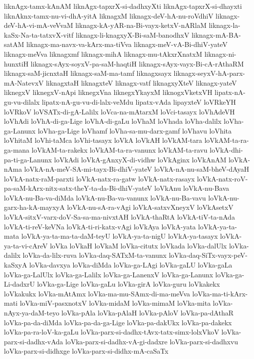 {liknAgx-tamx-kAnAM
liknAgx-tapxrX-si-dadhxyXti
liknAgx-tapxrX-si-dhayxti
liknAknx-tamx-nu-vi-dhA-yitA
liknagxM
liknagx-deV-hA-nu-roVdhiV
liknagx-deV-hA-vi-mA-veVvaM
liknagx-kA-yAR-na-Bi-vayx-ketxV-nARlaM
liknagx-la-kaSx-Na-ta-tatxvX-vitf
liknagx-li-knagxyX-Bi-saM-banodhxV
liknagx-mA-BA-satAM
liknagx-ma-navx-va-kArx-ma-tiVva
liknagx-meV-vA-Bi-dhiV-yateV
liknagx-meVva
liknagxmf
liknagx-mihA
liknagx-mu-tAkxrXnatxM
liknagx-ni-hunxtiH
liknagx-sAyx-soyxV-pa-saM-haqtiH
liknagx-sAyx-vayx-Bi-cA-rAthaRM
liknagx-saM-jicnxtaH
liknagx-saM-ma-tamf
liknagxsayx
liknagx-seyxV-hA-parx-mA-NatevxV
liknagxtaH
liknagxteV
liknagx-vatf
liknagxyXteV
liknagx-yateV
liknegxV
liknegxV-nApi
liknegxVna
liknegxYkayxM
liknogxVketxVH
lipatx-nA-gu-vu-dilalx
lipatx-nA-gu-vu-di-lalx-veMdu
lipatx-vAda
lipayxteV
loVRkeYH
loVRkoV
loVSATx-di-gA-Lalilx
loVca-na-mAtarxM
loVci-tasayx
loVhAdeVH
loVhAdi
loVhA-di-ga-Lige
loVhA-di-gaLu
loVhaM
loVhada
loVha-dalilx
loVha-ga-Lanunx
loVha-ga-Lige
loVhamf
loVha-sa-mu-darx-gamf
loVhavu
loVhita
loVhitaM
loVhi-taMca
loVhi-tasayx
loVkA
loVkAH
loVkAM-tara
loVkAM-ta-ra-ga-mana
loVkAM-ta-rakekx
loVkAM-ta-ra-vanunx
loVkAM-ta-ravu
loVkA-dhi-pa-ti-ga-Lanunx
loVkAdi
loVkA-gAnxyX-di-vidhw
loVkAginx
loVkAnAM
loVkA-nAma
loVkA-nA-meV-SA-mi-tayx-Bi-dhiV-yateV
loVkA-nA-nu-saM-bheV-dAyaH
loVkA-natx-raM-parxti
loVkA-natx-ra-gatw
loVkA-natx-rasayx
loVkA-natx-roV-pa-saM-kArx-nitx-satx-theY-ta-da-Bi-dhiV-yateV
loVkAnu
loVkA-nu-Bava
loVkA-nu-Ba-va-diMda
loVkA-nu-Ba-va-vanunx
loVkA-nu-Ba-vavu
loVkA-nu-garx-ha-kA-mayxyA
loVkA-nu-sA-ra-vAgi
loVkA-satxvXneyxV
loVkAsetxV
loVkA-sitxV-varx-doV-Sa-sa-ma-nivxtAH
loVkA-thaRtA
loVkA-tiV-ta-nAda
loVkA-ti-reV-keVNa
loVkA-ti-ri-katx-vAgi
loVkAya
loVkA-yata
loVkA-ya-ta-mata
loVkA-ya-ta-ma-ta-daM-teyU
loVkA-ya-ta-nigU
loVkA-ya-tasayx
loVkA-ya-ta-vi-cAreV
loVka
loVkaH
loVkaM
loVka-citutx
loVkada
loVka-dalUlx
loVka-dalilx
loVka-da-lilx-ruva
loVka-daq-SATxM-ta-vanunx
loVka-daq-SiTx-vayx-peV-kaSxyA
loVka-davxya
loVka-diMda
loVka-ga-LAgi
loVka-gaLU
loVka-gaLa
loVka-ga-LalUlx
loVka-ga-Lalilx
loVka-ga-LanenxV
loVka-ga-Lanunx
loVka-ga-Li-dadxrU
loVka-ga-Lige
loVka-gaLu
loVka-girA
loVka-guru
loVkakekx
loVkakukx
loVka-mAtAmx
loVka-ma-mu-SAmx-di-ma-meVva
loVka-ma-ti-kArx-mati
loVka-miV-pasxnotxV
loVka-midaM
loVka-mimaM
loVka-mita
loVka-nAyx-ya-daM-teyo
loVka-pAla
loVka-pAlaH
loVka-pAloV
loVka-pa-dAthaR
loVka-pa-da-diMda
loVka-pa-da-ga-Lige
loVka-pa-dakUkx
loVka-pa-dakekx
loVka-pa-ra-loV-ka-gaLu
loVka-parx-si-dadhx-tAvx-tatx-simx-lolxVkoV
loVka-parx-si-dadhx-vAda
loVka-parx-si-dadhx-vA-gi-dadxre
loVka-parx-si-dadhxvu
loVka-parx-si-didhxge
loVka-parx-si-didhx-mA-caSaTx
}
